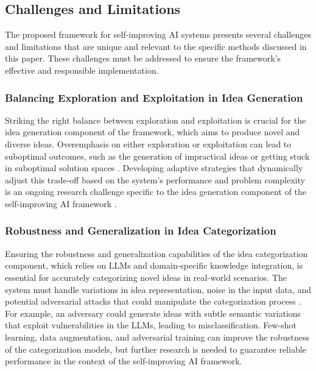 \documentclass[conference]{article}
\begin{document}
	\subsection{Challenges and Limitations}
	The proposed framework for self-improving AI systems presents several challenges and limitations that are unique and relevant to the specific methods discussed in this paper. These challenges must be addressed to ensure the framework's effective and responsible implementation.
	
	\subsubsection{Balancing Exploration and Exploitation in Idea Generation}
	Striking the right balance between exploration and exploitation is crucial for the idea generation component of the framework, which aims to produce novel and diverse ideas. Overemphasis on either exploration or exploitation can lead to suboptimal outcomes, such as the generation of impractical ideas or getting stuck in suboptimal solution spaces \cite{sutton2018reinforcement}. Developing adaptive strategies that dynamically adjust this trade-off based on the system's performance and problem complexity is an ongoing research challenge specific to the idea generation component of the self-improving AI framework \cite{auer2002using}.
	
	\subsubsection{Robustness and Generalization in Idea Categorization}
	Ensuring the robustness and generalization capabilities of the idea categorization component, which relies on LLMs and domain-specific knowledge integration, is essential for accurately categorizing novel ideas in real-world scenarios. The system must handle variations in idea representation, noise in the input data, and potential adversarial attacks that could manipulate the categorization process \cite{goodfellow2014explaining}. For example, an adversary could generate ideas with subtle semantic variations that exploit vulnerabilities in the LLMs, leading to misclassification. Few-shot learning, data augmentation, and adversarial training can improve the robustness of the categorization models, but further research is needed to guarantee reliable performance in the context of the self-improving AI framework.
	
\end{document}
